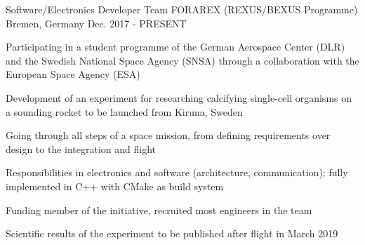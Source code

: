 

\begin{cventries}

  \cventry
    {Software/Electronics Developer} %
    {Team FORAREX (REXUS/BEXUS Programme)} %
    {Bremen, Germany} %
    {Dec. 2017 - PRESENT} %
    {
      \begin{cvitems} %
        \item {Participating in a student programme of the German Aerospace Center (DLR) and the Swedish National Space Agency (SNSA) through a collaboration with the European Space Agency (ESA)}
        \item {Development of an experiment for researching calcifying single-cell organisms on a sounding rocket to be launched from Kiruna, Sweden}
        \item {Going through all steps of a space mission, from defining requirements over design to the integration and flight}
        \item {Responsibilities in electronics and software (architecture, communication); fully implemented in C++ with CMake as build system}
        \item {Funding member of the initiative, recruited most engineers in the team}
        \item {Scientific results of the experiment to be published after flight in March 2019}
      \end{cvitems}
    }

\end{cventries}
